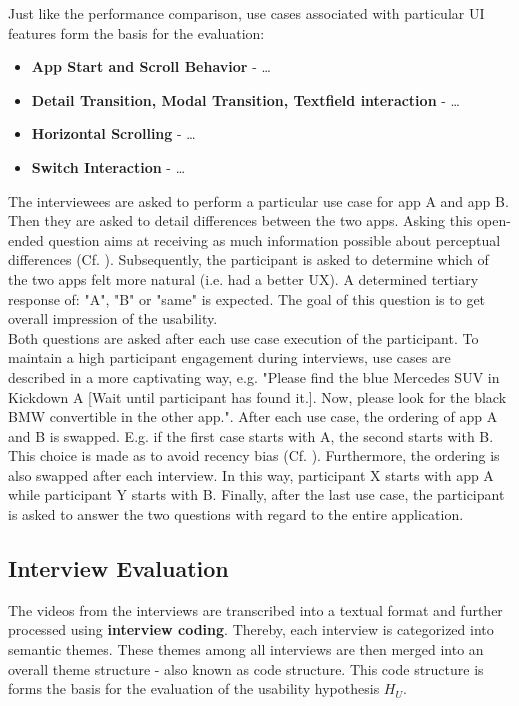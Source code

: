 Just like the performance comparison, use cases associated with particular UI features form the basis for the evaluation: 
\begin{itemize}
    \item \textbf{App Start and Scroll Behavior} - \dots
    \item \textbf{Detail Transition, Modal Transition, Textfield interaction} - \dots
    \item \textbf{Horizontal Scrolling} - \dots
    \item \textbf{Switch Interaction} - \dots
\end{itemize}
The interviewees are asked to perform a particular use case for app A and app B. Then they are asked to detail differences between the two apps.
Asking this open-ended question aims at receiving as much information possible about perceptual differences (Cf. \cite[182--185]{Helferrich2011}).
Subsequently, the participant is asked to determine which of the two apps felt more natural (i.e. had a better UX). A determined tertiary response of: "A", "B" or "same" is expected. 
The goal of this question is to get overall impression of the usability. \\
Both questions are asked after each use case execution of the participant. 
To maintain a high participant engagement during interviews, use cases are described in a more captivating way, e.g. "Please find the blue Mercedes SUV in Kickdown A [Wait until participant has found it.]. Now, 
please look for the black BMW convertible in the other app.". 
After each use case, the ordering of app A and B is swapped. E.g. if the first case starts with A, the second starts with B. This choice is made as to avoid recency bias (Cf. \cite{Atkinson1968}).
Furthermore, the ordering is also swapped after each interview. In this way, participant X starts with app A while participant Y starts with B.
Finally, after the last use case, the participant is asked to answer the two questions with regard to the entire application.


\subsection{Interview Evaluation}
The videos from the interviews are transcribed into a textual format and further processed using \textbf{interview coding}. Thereby, each interview is categorized into semantic themes. These themes among
all interviews are then merged into an overall theme structure - also known as code structure. This code structure is forms the basis for the evaluation of the usability hypothesis $H_U$. 
